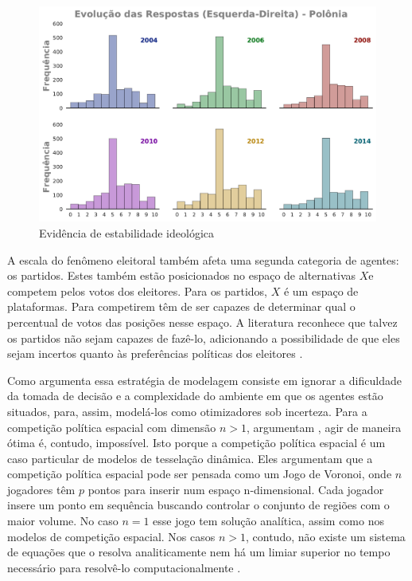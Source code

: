 \begin{figure}[H]
  \centering
\caption{Evidência de estabilidade ideológica}
  \includegraphics[width = \textwidth]{ims/ess_Pol_plots.pdf}
  
\end{figure}

A escala do fenômeno eleitoral também afeta uma segunda categoria de agentes: os
partidos. Estes também estão posicionados no espaço de alternativas \(X\)e
competem pelos votos dos eleitores. Para os partidos, \(X\) é um espaço de
plataformas. Para competirem têm de ser capazes de determinar qual o percentual
de votos das posições nesse espaço. A literatura reconhece que talvez os
partidos não sejam capazes de fazê-lo, adicionando a possibilidade de que eles
sejam incertos quanto às preferências políticas dos eleitores
\cite{glazer1989model, grofman2004downs}.


Como argumenta  essa estratégia de modelagem
consiste em ignorar a dificuldade da tomada de decisão e a complexidade do
ambiente em que os agentes estão situados, para, assim, modelá-los como
otimizadores sob incerteza. Para a competição política espacial com dimensão
$n>1$, argumentam , agir de maneira ótima é, contudo,
impossível. Isto porque a competição política espacial é um caso particular de
modelos de tesselação dinâmica. Eles argumentam que a competição política
espacial pode ser pensada como um Jogo de Voronoi, onde \(n\) jogadores têm
\(p\) pontos para inserir num espaço n-dimensional. Cada jogador insere um ponto
em sequência buscando controlar o conjunto de regiões com o maior volume. No
caso \(n=1\) esse jogo tem solução analítica, assim como nos modelos de
competição espacial. Nos casos \(n>1\), contudo, não existe um sistema de
equações que o resolva analiticamente nem há um limiar superior no tempo
necessário para resolvê-lo computacionalmente \cite[p.24]{laver2011party}.

